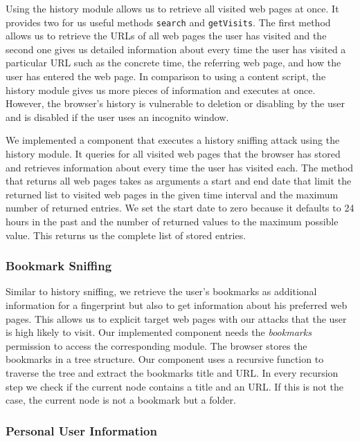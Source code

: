 	Using the history module allows us to retrieve all visited web pages at once. It provides two for us useful methods \texttt{search} and \texttt{getVisits}. The first method allows us to retrieve the URLs of all web pages the user has visited and the second one gives us detailed information about every time the user has visited a particular URL such as the concrete time, the referring web page, and how the user has entered the web page. In comparison to using a content script, the history module gives us more pieces of information and executes at once. However, the browser's history is vulnerable to deletion or disabling by the user and is disabled if the user uses an incognito window.
	
	We implemented a component that executes a history sniffing attack using the history module. It queries for all visited web pages that the browser has stored and retrieves information about every time the user has visited each. The method that returns all web pages takes as arguments a start and end date that limit the returned list to visited web pages in the given time interval and the maximum number of returned entries. We set the start date to zero because it defaults to 24 hours in the past and the number of returned values to the maximum possible value. This returns us the complete list of stored entries.
	
\subsubsection{Bookmark Sniffing}
\label{sec:bookmarkSniffing}

	Similar to history sniffing, we retrieve the user's bookmarks as additional information for a fingerprint but also to get information about his preferred web pages. This allows us to explicit target web pages with our attacks that the user is high likely to visit. Our implemented component needs the \textit{bookmarks} permission to access the corresponding module. The browser stores the bookmarks in a tree structure. Our component uses a recursive function to traverse the tree and extract the bookmarks title and URL. In every recursion step we check if the current node contains a title and an URL. If this is not the case, the current node is not a bookmark but a folder.

\subsubsection{Personal User Information}
\label{sec:personalUserInformation}
	
